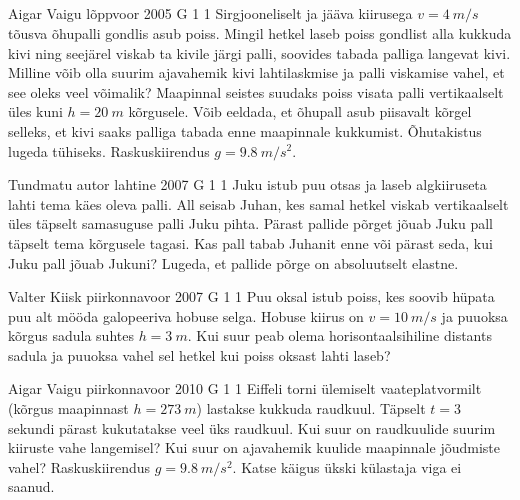 \documentclass[11pt]{article}
\begin{document}
{        \subsection{\protect{}}

\graphicspath{{../problems/}}

{Aigar Vaigu} %
{lõppvoor} %
{2005} %
{G 1} %
{1} %
{
\ifStatement
Sirgjooneliselt ja jääva kiirusega $v = \SI{4}{m/s}$ tõusva õhupalli gondlis asub poiss. Mingil hetkel laseb poiss gondlist alla kukkuda kivi ning seejärel viskab ta kivile järgi palli, soovides tabada palliga langevat kivi. Milline võib olla suurim ajavahemik kivi lahtilaskmise ja palli viskamise vahel, et see oleks veel võimalik? Maapinnal seistes suudaks poiss visata palli vertikaalselt üles kuni $h = \SI{20}{m}$ kõrgusele. Võib eeldada, et õhupall asub piisavalt kõrgel selleks, et kivi saaks palliga tabada enne maapinnale kukkumist. Õhutakistus lugeda tühiseks. Raskuskiirendus $g = \SI{9,8}{m/s^2}$.
\fi
}

{Tundmatu autor} %
{lahtine} %
{2007} %
{G 1} %
{1} %
{
\ifStatement
Juku istub puu otsas ja laseb algkiiruseta lahti tema käes oleva palli. All seisab Juhan, kes samal hetkel viskab vertikaalselt üles täpselt samasuguse palli Juku pihta. Pärast pallide põrget jõuab Juku pall täpselt tema kõrgusele tagasi. Kas pall tabab Juhanit enne või pärast seda, kui Juku pall jõuab Jukuni? Lugeda, et pallide põrge on absoluutselt elastne.
\fi
}

{Valter Kiisk} %
{piirkonnavoor} %
{2007} %
{G 1} %
{1} %
{
\ifStatement
Puu oksal istub poiss, kes soovib hüpata puu alt mööda galopeeriva hobuse selga. Hobuse kiirus on $v = \SI{10}{m/s}$ ja puuoksa kõrgus sadula suhtes $h = \SI{3}{m}$. Kui suur peab olema horisontaalsihiline distants sadula ja puuoksa vahel sel hetkel kui poiss oksast lahti laseb?
\fi
}

{Aigar Vaigu} %
{piirkonnavoor} %
{2010} %
{G 1} %
{1} %
{
\ifStatement
Eiffeli torni ülemiselt vaateplatvormilt (kõrgus maapinnast
$h=\SI{273}{m}$) lastakse kukkuda raudkuul. Täpselt $t=3$ sekundi pärast kukutatakse
veel üks raudkuul. Kui suur on raudkuulide suurim
kiiruste vahe langemisel? Kui suur on ajavahemik kuulide maapinnale jõudmiste
vahel? Raskuskiirendus $g=\SI{9.8}{m/s^2}$. Katse käigus ükski külastaja viga ei saanud.
\fi
}

}
\end{document}
